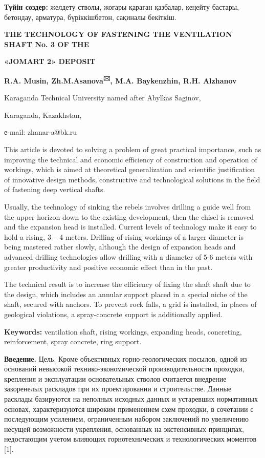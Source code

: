 {\bfseries Түйін сөздер:} желдету стволы, жоғары қараған қазбалар, кеңейту
бастары, бетондау, арматура, бүріккішбетон, сақиналы бекіткіш.

{\bfseries THE TECHNOLOGY OF FASTENING THE VENTILATION SHAFT No. 3 OF THE}

{\bfseries «JOMART 2» DEPOSIT}

{\bfseries R.A. Musin, Zh.M.Asanova\textsuperscript{🖂}, M.A. Baykenzhin,
R.H. Alzhanov}

Karaganda Technical University named after Abylkas Saginov,

Karaganda, Kazakhstan,

е-mail: zhanar-a@bk.ru

This article is devoted to solving a problem of great practical
importance, such as improving the technical and economic efficiency of
construction and operation of workings, which is aimed at theoretical
generalization and scientific justification of innovative design
methods, constructive and technological solutions in the field of
fastening deep vertical shafts.

Usually, the technology of sinking the rebels involves drilling a guide
well from the upper horizon down to the existing development, then the
chisel is removed and the expansion head is installed. Current levels of
technology make it easy to hold a rising, 3 -- 4 meters. Drilling of
rising workings of a larger diameter is being mastered rather slowly,
although the design of expansion heads and advanced drilling
technologies allow drilling with a diameter of 5-6 meters with greater
productivity and positive economic effect than in the past.

The technical result is to increase the efficiency of fixing the shaft
shaft due to the design, which includes an annular support placed in a
special niche of the shaft, secured with anchors. To prevent rock falls,
a grid is installed, in places of geological violations, a
spray-concrete support is additionally applied.

{\bfseries Keywords:} ventilation shaft, rising workings, expanding heads,
concreting, reinforcement, spray concrete, ring support.

{\bfseries Введение.} Цель. Кроме объективных горно-геологических посылов,
одной из оснований невысокой технико-экономической производительности
проходки, крепления и эксплуатации основательных стволов считается
внедрение закоренелых раскладов при их проектировании и строительстве.
Данные расклады базируются на неполных исходных данных и устаревших
нормативных основах, характеризуются широким применением схем проходки,
в сочетании с последующим усилением, ограниченным набором заключений по
увеличению несущей возможности укрепления, основанных на экстенсивных
принципах, недостающим учетом влияющих горнотехнических и
технологических моментов {[}1{]}.


